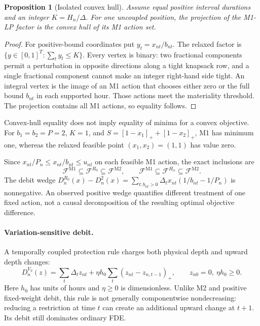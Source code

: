 \documentclass[11pt]{article}
\newtheorem{proposition}{Proposition}
\newcommand{\F}{\mathcal F}
\begin{document}
\begin{proposition}[Isolated convex hull]
Assume equal positive interval durations and an integer $K=H_n/\Delta$. For one uncoupled position, the projection of the M1-LP factor is the convex hull of its M1 action set.
\end{proposition}
\begin{proof}
For positive-bound coordinates put $y_t=x_{nt}/b_{nt}$. The relaxed factor is $\{y\in[0,1]^T: \sum_t y_t\leq K\}$. Every vertex is binary: two fractional components permit a perturbation in opposite directions along a tight knapsack row, and a single fractional component cannot make an integer right-hand side tight. An integral vertex is the image of an M1 action that chooses either zero or the full bound $b_{nt}$ in each supported hour. Those actions meet the materiality threshold. The projection contains all M1 actions, so equality follows.
\end{proof}
Convex-hull equality does not imply equality of minima for a convex objective. For $b_1=b_2=P=2$, $K=1$, and $S=[1-x_1]_++[1-x_2]_+$, M1 has minimum one, whereas the relaxed feasible point $(x_1,x_2)=(1,1)$ has value zero.

Since $x_{nt}/P_n\leq x_{nt}/b_{nt}\leq u_{nt}$ on each feasible M1 action, the exact inclusions are
\begin{equation}
 \F^{\mathrm{M1}}\subseteq\F^{R_0}\subseteq\F^{\mathrm{M2}},\qquad
 \F^{\mathrm{M1}}\subseteq\F^{H_\alpha}\subseteq\F^{\mathrm{M2}}.
\end{equation}
The debit wedge $D_n^{R_0}(x)-D_n^2(x)=\sum_{t:b_{nt}>0}\Delta_tx_{nt}(1/b_{nt}-1/P_n)$ is nonnegative. An observed positive wedge quantifies different treatment of one fixed action, not a causal decomposition of the resulting optimal objective difference.

\paragraph{Variation-sensitive debit.}
A temporally coupled protection rule charges both physical depth and upward depth changes:
\begin{equation}
 D_n^{V_\eta}(z)=\sum_t\Delta_tz_{nt}+\eta h_0\sum_t(z_{nt}-z_{n,t-1})_+,
 \qquad z_{n0}=0,\ \eta h_0\geq0.
 \label{eq:variation}
\end{equation}
Here $h_0$ has units of hours and $\eta\geq0$ is dimensionless. Unlike M2 and positive fixed-weight debit, this rule is not generally componentwise nondecreasing: reducing a restriction at time $t$ can create an additional upward change at $t+1$. Its debit still dominates ordinary FDE.
\end{document}
